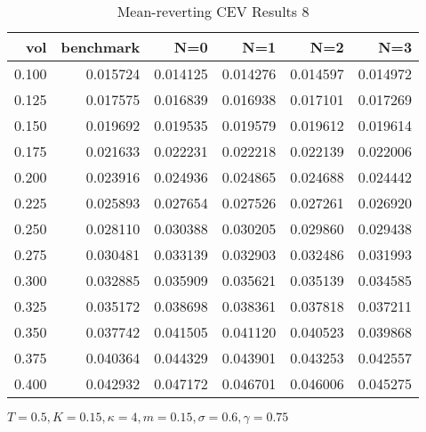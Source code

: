 \begin{table}[ht]
  \centering
  \caption{Mean-reverting CEV Results 8}
  \begin{tabular}{rrrrrr}
  \toprule
    vol &       benchmark &       N=0 &       N=1 &       N=2 &       N=3 \\
  \midrule
  0.100 & 0.015724 & 0.014125 & 0.014276 & 0.014597 & 0.014972 \\
  0.125 & 0.017575 & 0.016839 & 0.016938 & 0.017101 & 0.017269 \\
  0.150 & 0.019692 & 0.019535 & 0.019579 & 0.019612 & 0.019614 \\
  0.175 & 0.021633 & 0.022231 & 0.022218 & 0.022139 & 0.022006 \\
  0.200 & 0.023916 & 0.024936 & 0.024865 & 0.024688 & 0.024442 \\
  0.225 & 0.025893 & 0.027654 & 0.027526 & 0.027261 & 0.026920 \\
  0.250 & 0.028110 & 0.030388 & 0.030205 & 0.029860 & 0.029438 \\
  0.275 & 0.030481 & 0.033139 & 0.032903 & 0.032486 & 0.031993 \\
  0.300 & 0.032885 & 0.035909 & 0.035621 & 0.035139 & 0.034585 \\
  0.325 & 0.035172 & 0.038698 & 0.038361 & 0.037818 & 0.037211 \\
  0.350 & 0.037742 & 0.041505 & 0.041120 & 0.040523 & 0.039868 \\
  0.375 & 0.040364 & 0.044329 & 0.043901 & 0.043253 & 0.042557 \\
  0.400 & 0.042932 & 0.047172 & 0.046701 & 0.046006 & 0.045275 \\
  \bottomrule
  \end{tabular}
  \small{$T=0.5,K=0.15, \kappa = 4,m=0.15, \sigma = 0.6, \gamma = 0.75$}
\end{table}

